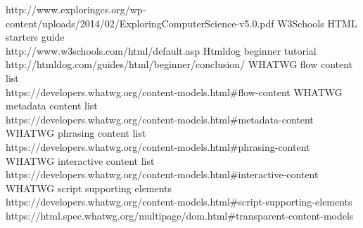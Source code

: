 \documentclass[conference]{IEEEtran}
\begin{document}
\begin{thebibliography}{1}
  http://www.exploringcs.org/wp-content/uploads/2014/02/ExploringComputerScience-v5.0.pdf
  W3Schools HTML starters guide\\
  http://www.w3schools.com/html/default.asp
  Htmldog beginner tutorial http://htmldog.com/guides/html/beginner/conclusion/
  WHATWG flow content list\\
  https://developers.whatwg.org/content-models.html\#flow-content
  WHATWG metadata content list\\
  https://developers.whatwg.org/content-models.html\#metadata-content
  WHATWG phrasing content list\\
  https://developers.whatwg.org/content-models.html\#phrasing-content
  WHATWG interactive content list\\
  https://developers.whatwg.org/content-models.html\#interactive-content
  WHATWG script supporting elements\\
  https://developers.whatwg.org/content-models.html\#script-supporting-elements
  https://html.spec.whatwg.org/multipage/dom.html\#transparent-content-models

\end{thebibliography}

\end{document}
